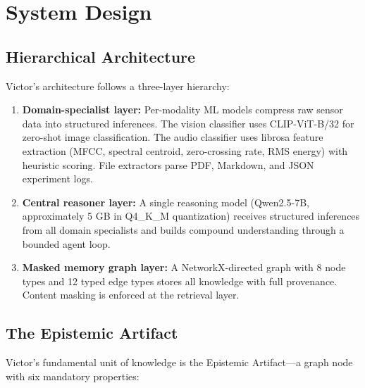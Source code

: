 \documentclass[letterpaper]{article}          %
\theoremstyle{plain}
\theoremstyle{definition}
\theoremstyle{remark}
\begin{document}

\section{System Design}

\subsection{Hierarchical Architecture}

Victor's architecture follows a three-layer hierarchy:

\begin{enumerate}
    \item \textbf{Domain-specialist layer:} Per-modality ML models compress raw
    sensor data into structured inferences. The vision classifier uses
    CLIP-ViT-B/32 \citep{radford2021clip} for zero-shot image classification.
    The audio classifier uses librosa feature extraction (MFCC, spectral
    centroid, zero-crossing rate, RMS energy) with heuristic scoring. File
    extractors parse PDF, Markdown, and JSON experiment logs.
    \item \textbf{Central reasoner layer:} A single reasoning model
    (Qwen2.5-7B, approximately 5 GB in Q4\_K\_M quantization) receives
    structured inferences from all domain specialists and builds compound
    understanding through a bounded agent loop.
    \item \textbf{Masked memory graph layer:} A NetworkX-directed graph with
    8 node types and 12 typed edge types stores all knowledge with full
    provenance. Content masking is enforced at the retrieval layer.
\end{enumerate}

\subsection{The Epistemic Artifact}

Victor's fundamental unit of knowledge is the Epistemic Artifact---a graph node
with six mandatory properties:
\end{document}
